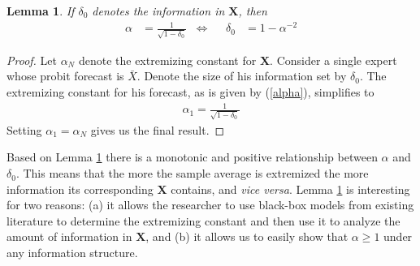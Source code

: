 \documentclass[11pt,twoside]{article}
\newtheorem{lemma}[theorem]{Lemma}
\begin{document}
\begin{lemma}
\label{infoLemma}
If $\delta_0$ denotes the information in $\boldsymbol{X}$, then 
\begin{align*}
\alpha &= \frac{1}{\sqrt{1-\delta_0}} &\Leftrightarrow&& \delta_0 &=1-\alpha^{-2}
\end{align*}
\end{lemma}
\begin{proof}
Let $\alpha_N$ denote the extremizing constant for $\boldsymbol{X}$. Consider a single expert whose probit forecast is $\bar{X}$. Denote the size of his information set by $\delta_0$. The extremizing constant for his forecast, as is given by (\ref{alpha}), simplifies to
\begin{align*}
\alpha_1  =  \frac{1}{\sqrt{1-\delta_0}}
\end{align*}
Setting $\alpha_1 = \alpha_N$ gives us the final result.

\end{proof}

Based on Lemma \ref{infoLemma} there is a monotonic and positive relationship between $\alpha$ and $\delta_0$. This means that the more the sample average is extremized the more information its corresponding $\boldsymbol{X}$ contains, and \textit{vice versa}. Lemma \ref{infoLemma}  is interesting for two reasons: (a) it allows the researcher to use black-box models from existing literature to determine the extremizing constant and then use it to analyze the amount of information in $\boldsymbol{X}$, and (b) it allows us to easily show that $\alpha \geq 1$ under any information structure.
\end{document}
